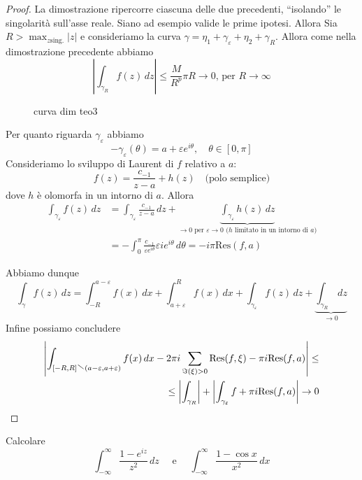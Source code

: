\begin{proof}
    La dimostrazione ripercorre ciascuna delle due precedenti, ``isolando'' le
    singolarità sull'asse reale. Siano ad esempio valide le prime ipotesi.
    Allora Sia \(R > \max_{z \text{sing.}}  |z|\) e consideriamo la curva
    \(\gamma = \eta_{1} + \gamma_\varepsilon + \eta_{2} + \gamma_R\). Allora
    come nella dimostrazione precedente abbiamo
    \[
      \left| \int _{\gamma_R} f{(z)} \,dz \right| \le \frac{M}{R^p}\pi R \to 0
      \text{,  per } R \to \infty
    \]
\begin{figure}[ht]
    \centering
    \caption{curva dim teo3}
    \label{fig:curva-dim-teo3}
\end{figure}
    Per quanto riguarda \(\gamma_\varepsilon\) abbiamo
    \[
      -\gamma_\varepsilon {(\theta)} = a + \varepsilon e ^{i\theta}, \quad
      \theta \in [0, \pi]
    \]
    Consideriamo lo sviluppo di Laurent di \(f\) relativo a \(a\):
    \[
      f{(z)} = \frac{c_{-1}}{z-a} + h{(z)} \quad \text{(polo semplice)}
    \]
    dove \(h\) è olomorfa in un intorno di \(a\). Allora
    \begin{align*}
        \int_{\gamma_\varepsilon}f{(z)}  \,dz &=
      \int_{\gamma_\varepsilon}\frac{c_{-1}}{z-a}  \,d z +
      \underbrace{\int_{\gamma_\varepsilon} h{(z)} \,d z}_{\to  0 \text{ per }
      \varepsilon \to 0 \text{ (\(h\) limitato in un intorno di \(a\))}} \\
      &= -\int_{0}^{\pi} \frac{c_{-1} }{\varepsilon e^{i\theta}}\varepsilon i
      e^{i\theta} \,d \theta = -i \pi \mathrm{Res} {(f,a)}
    \end{align*}
    
    Abbiamo dunque
    \[
      \int _{\gamma} f{(z)} \,dz = \int_{-R}^{a-\varepsilon} f{(x)} \,dx +
      \int_{a+\varepsilon}^{R} f{(x)}  \,dx + \int_{\gamma_\varepsilon} f{(z)}
      \,dz + \underbrace{\int_{\gamma_R}  \,dz}_{\to 0 } 
    \]
    Infine possiamo concludere
    \begin{align*}
        \left| \int_{[-R, R] \sminus {(a-\varepsilon, a+\varepsilon)}} f{(x)}
        \,dx  - 2\pi i \sum_{\Im {(\xi)}> 0} \mathrm{Res}{(f, \xi)} - \pi i
        \mathrm{Res} {(f, a)}\right|\le \\ \le  \left| \int _{\gamma_R}\right| +
        \left| \int _{\gamma_\varepsilon} f + \pi i \mathrm{Res}{(f, a)}\right|
        \to 0
    \end{align*}
\end{proof}

\begin{eser}
    Calcolare 
    \[
        \int_{-\infty}^{\infty} \frac{1-e^{iz}}{z^2} \,dz 
        \quad \text{   e   }\quad
        \int_{-\infty}^{\infty} \frac{1-\cos x}{x^2} \,dx \tag*{[$\pi$
        entrambi]}
    \]
\end{eser}

